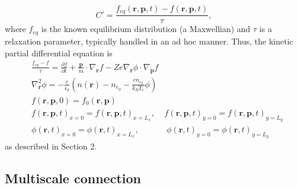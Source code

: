 \documentclass{article}
\begin{document}
\[C'=\frac{f_{eq}(\mathbf{r},\mathbf{p},t)-f(\mathbf{r},\mathbf{p},t)}{\tau},
\]where $f_{eq}$ is the known equilibrium distribution (a Maxwellian) and $\tau$ is a relaxation parameter, typically handled in an ad hoc manner. Thus, the kinetic partial differential equation is
\begin{equation*}
\begin{split}
&\frac{f_{eq}-f}{\tau}=\frac{\partial f}{\partial t}+\frac{\mathbf{p}}{m}\cdot \nabla_\mathbf{r} f-Ze\nabla_\mathbf{r}\phi\cdot\nabla_\mathbf{p}f\\
&\nabla^2_\mathbf{r}\phi=-\frac{e}{\epsilon_0}\left(n(\mathbf{r})-n_{e_0}-\frac{en_{e_0}}{k_BT_e}\phi\right)\\
&f(\mathbf{r},\mathbf{p},0)=f_0(\mathbf{r},\mathbf{p})\\
&f(\mathbf{r},\mathbf{p},t)_{x=0}=f(\mathbf{r},\mathbf{p},t)_{x=L_x},\;\;\;\;
f(\mathbf{r},\mathbf{p},t)_{y=0}=f(\mathbf{r},\mathbf{p},t)_{y=L_y}\\
&\phi(\mathbf{r},t)_{x=0}=\phi(\mathbf{r},t)_{x=L_x},\;\;\;\;\;\;\;\;\;\;\;\;
\phi(\mathbf{r},t)_{y=0}=\phi(\mathbf{r},t)_{y=L_y}
\end{split}
\end{equation*}as described in Section 2. 

\subsection{Multiscale connection}
\end{document}
